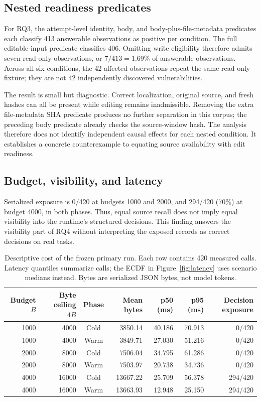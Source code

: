 \subsection{Nested readiness predicates}
For RQ3, the attempt-level identity, body, and body-plus-file-metadata predicates each classify 413 answerable observations as positive per condition. The full editable-input predicate classifies 406. Omitting write eligibility therefore admits seven read-only observations, or $7/413=1.69\%$ of answerable observations. Across all six conditions, the 42 affected observations repeat the same read-only fixture; they are not 42 independently discovered vulnerabilities.

The result is small but diagnostic. Correct localization, original source, and fresh hashes can all be present while editing remains inadmissible. Removing the extra file-metadata SHA predicate produces no further separation in this corpus; the preceding body predicate already checks the source-window hash. The analysis therefore does not identify independent causal effects for each nested condition. It establishes a concrete counterexample to equating source availability with edit readiness.

\subsection{Budget, visibility, and latency}
Serialized  exposure is 0/420 at budgets 1000 and 2000, and 294/420 (70\%) at budget 4000, in both phases. Thus, equal source recall does not imply equal visibility into the runtime's structured decisions. This finding answers the visibility part of RQ4 without interpreting the exposed records as correct decisions on real tasks.

\begin{table}[t]
\centering\small
\caption{Descriptive cost of the frozen primary run. Each row contains 420 measured calls. Latency quantiles summarize calls; the ECDF in Figure~\ref{fig:latency} uses scenario medians instead. Bytes are serialized JSON bytes, not model tokens.}
\label{tab:cost}
\begin{tabular}{@{}rrcrrrr@{}}
\toprule
Budget $B$ & Byte ceiling $4B$ & Phase & Mean bytes & p50 (ms) & p95 (ms) & Decision exposure\\
\midrule
1000 & 4000 & Cold & 3850.14 & 40.186 & 70.913 & 0/420\\
1000 & 4000 & Warm & 3849.71 & 27.030 & 51.216 & 0/420\\
2000 & 8000 & Cold & 7506.04 & 34.795 & 61.286 & 0/420\\
2000 & 8000 & Warm & 7503.97 & 20.738 & 34.736 & 0/420\\
4000 & 16000 & Cold & 13667.22 & 25.709 & 56.378 & 294/420\\
4000 & 16000 & Warm & 13663.93 & 12.948 & 25.150 & 294/420\\
\bottomrule
\end{tabular}
\end{table}

